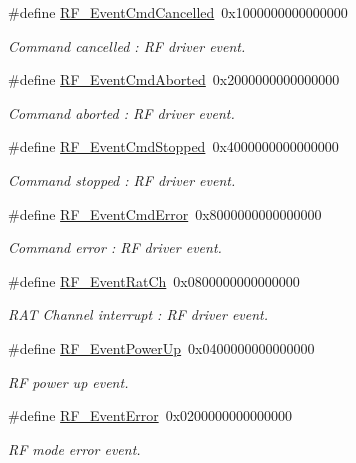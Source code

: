 \begin{DoxyCompactItemize}
\item 
\#define \hyperlink{group___r_f___driver___events_gae6d21f9806a7482a0f324f98bb83aac0}{R\+F\+\_\+\+Event\+Cmd\+Cancelled}~0x1000000000000000
\begin{DoxyCompactList}\small\item\em Command cancelled \+: R\+F driver event. \end{DoxyCompactList}\item 
\#define \hyperlink{group___r_f___driver___events_ga95a0bf832c19fbdce2c164144ad265ee}{R\+F\+\_\+\+Event\+Cmd\+Aborted}~0x2000000000000000
\begin{DoxyCompactList}\small\item\em Command aborted \+: R\+F driver event. \end{DoxyCompactList}\item 
\#define \hyperlink{group___r_f___driver___events_gac68cfb0f9c26d275ad990f5da9e6b91f}{R\+F\+\_\+\+Event\+Cmd\+Stopped}~0x4000000000000000
\begin{DoxyCompactList}\small\item\em Command stopped \+: R\+F driver event. \end{DoxyCompactList}\item 
\#define \hyperlink{group___r_f___driver___events_ga8255e5773828977cb205fd1f856e710e}{R\+F\+\_\+\+Event\+Cmd\+Error}~0x8000000000000000
\begin{DoxyCompactList}\small\item\em Command error \+: R\+F driver event. \end{DoxyCompactList}\item 
\#define \hyperlink{group___r_f___driver___events_gab0302093e17c587cc4bf2c928c79960e}{R\+F\+\_\+\+Event\+Rat\+Ch}~0x0800000000000000
\begin{DoxyCompactList}\small\item\em R\+A\+T Channel interrupt \+: R\+F driver event. \end{DoxyCompactList}\item 
\#define \hyperlink{group___r_f___driver___events_ga0e6d5e7d3760a65ba37d8f26823e9a0a}{R\+F\+\_\+\+Event\+Power\+Up}~0x0400000000000000
\begin{DoxyCompactList}\small\item\em R\+F power up event. \end{DoxyCompactList}\item 
\#define \hyperlink{group___r_f___driver___events_gaa6b858b8b383210049fa3f17dcd95fac}{R\+F\+\_\+\+Event\+Error}~0x0200000000000000
\begin{DoxyCompactList}\small\item\em R\+F mode error event. \end{DoxyCompactList}\end{DoxyCompactItemize}


